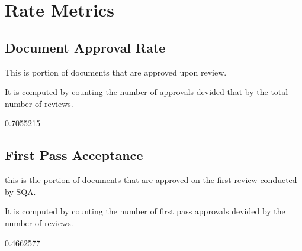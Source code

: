 \documentclass{article}
\begin{document}
\section{Rate Metrics}
\subsection{Document Approval Rate}
This is portion of documents that are approved upon review.

It is computed by counting the number of approvals devided that by the total number of reviews.

\begin{Schunk}
\begin{Soutput}
[1] 0.7055215
\end{Soutput}
\end{Schunk}

\subsection{First Pass Acceptance}
this is the portion of documents that are approved on the first review conducted
by SQA.

It is computed by counting the number of first pass approvals devided by
the number of reviews.

\begin{Schunk}
\begin{Soutput}
[1] 0.4662577
\end{Soutput}
\end{Schunk}
\end{document}
